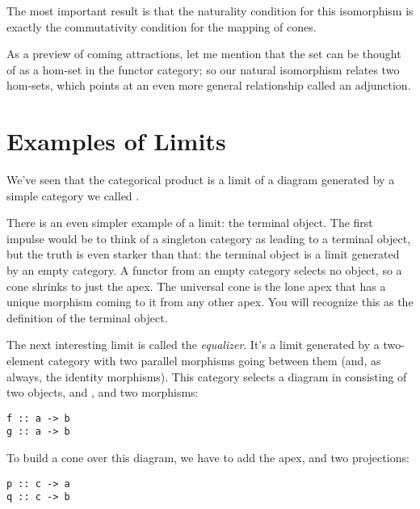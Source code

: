 The most important result is that the naturality condition for this
isomorphism is exactly the commutativity condition for the mapping of
cones.

As a preview of coming attractions, let me mention that the set
 can be thought of as a hom-set in the functor
category; so our natural isomorphism relates two hom-sets, which points
at an even more general relationship called an adjunction.

\section{Examples of Limits}\label{examples-of-limits}

We've seen that the categorical product is a limit of a diagram
generated by a simple category we called .

There is an even simpler example of a limit: the terminal object. The
first impulse would be to think of a singleton category as leading to a
terminal object, but the truth is even starker than that: the terminal
object is a limit generated by an empty category. A functor from an
empty category selects no object, so a cone shrinks to just the apex.
The universal cone is the lone apex that has a unique morphism coming to
it from any other apex. You will recognize this as the definition of the
terminal object.

The next interesting limit is called the \emph{equalizer}. It's a limit
generated by a two-element category with two parallel morphisms going
between them (and, as always, the identity morphisms). This category
selects a diagram in  consisting of two objects,  and
, and two morphisms:

\begin{Verbatim}[commandchars=\\\{\}]
f :: a -> b 
g :: a -> b
\end{Verbatim}
To build a cone over this diagram, we have to add the apex, 
and two projections:

\begin{Verbatim}[commandchars=\\\{\}]
p :: c -> a 
q :: c -> b
\end{Verbatim}

\begin{figure}[H]
\centering
{}
\end{figure}


